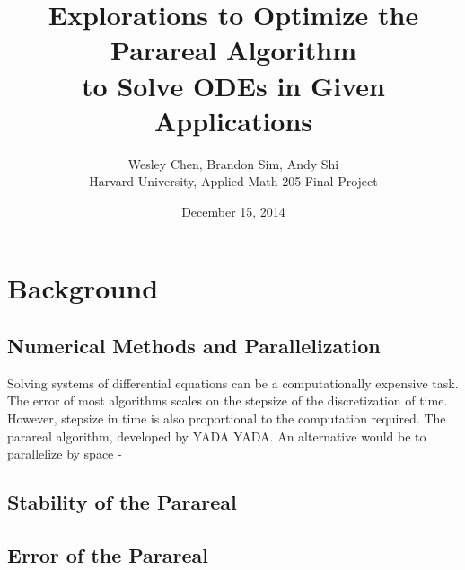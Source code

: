 \documentclass[letterpaper,twocolumn,11pt]{article}
\begin{document}
\title{Explorations to Optimize the Parareal Algorithm \\to Solve ODEs in Given Applications}
\author{Wesley Chen, Brandon Sim, Andy Shi \\
Harvard University, Applied Math 205 Final Project}
\date{December 15, 2014}

\setlength\parindent{0pt}

\setlength\parskip{2ex}

\section{Background}

\subsection{Numerical Methods and Parallelization}
Solving systems of differential equations can be a computationally expensive
task. The error of most algorithms scales on the stepsize of the discretization
of time. However, stepsize in time is also proportional to the computation
required. The parareal algorithm, developed by YADA YADA. An alternative would
be to parallelize by space - 

\subsection{Stability of the Parareal}

\subsection{Error of the Parareal}
\end{document}
